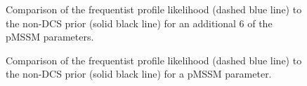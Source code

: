 \begin{figure}[htbp]
{}
\hspace{2mm}
\hspace{2mm}
\caption{Comparison of the frequentist profile likelihood (dashed blue line) to the non-DCS prior (solid black line) for an additional 6 of the pMSSM parameters. }
\label{fig:PandP3}
\end{figure}

\FloatBarrier

\renewcommand*\thesubfigure{\arabic{subfigure}}
\begin{figure}[htbp]
\centering
\hspace{2mm}
\caption{Comparison of the frequentist profile likelihood (dashed blue line) to the non-DCS prior (solid black line) for a pMSSM parameter. }
\label{fig:PandP4}
\end{figure}